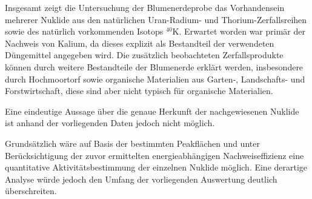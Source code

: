 Insgesamt zeigt die Untersuchung der Blumenerdeprobe das Vorhandensein mehrerer Nuklide aus den natürlichen Uran-Radium- und Thorium-Zerfallsreihen sowie des natürlich vorkommenden Isotops $^{40}$K. 
Erwartet worden war primär der Nachweis von Kalium, da dieses explizit als Bestandteil der verwendeten Düngemittel angegeben wird. 
Die zusätzlich beobachteten Zerfallsprodukte können durch weitere Bestandteile der Blumenerde erklärt werden, insbesondere durch Hochmoortorf sowie organische Materialien aus Garten-, Landschafts- und Forstwirtschaft, diese sind aber nicht typisch für organische Materialien.

Eine eindeutige Aussage über die genaue Herkunft der nachgewiesenen Nuklide ist anhand der vorliegenden Daten jedoch nicht möglich.

Grundsätzlich wäre auf Basis der bestimmten Peakflächen und unter Berücksichtigung der zuvor ermittelten energieabhängigen Nachweiseffizienz eine quantitative Aktivitätsbestimmung der einzelnen Nuklide möglich. 
Eine derartige Analyse würde jedoch den Umfang der vorliegenden Auswertung deutlich überschreiten.




